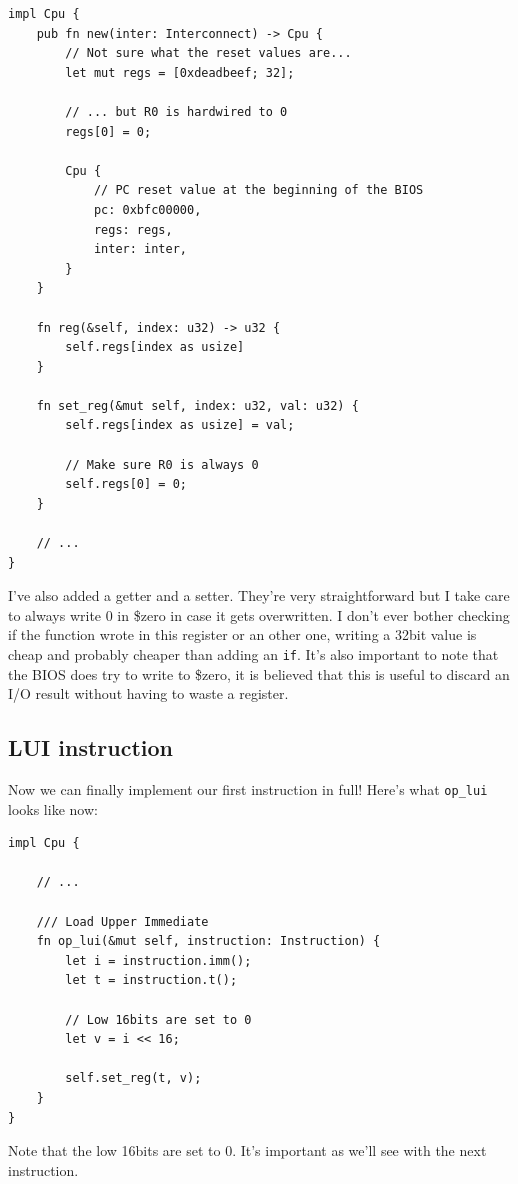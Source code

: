\documentclass[a4paper]{article}
\newcommand{\code}[1] {\texttt{#1}}
\begin{document}
\begin{lstlisting}
impl Cpu {
    pub fn new(inter: Interconnect) -> Cpu {
        // Not sure what the reset values are...
        let mut regs = [0xdeadbeef; 32];

        // ... but R0 is hardwired to 0
        regs[0] = 0;

        Cpu {
            // PC reset value at the beginning of the BIOS
            pc: 0xbfc00000,
            regs: regs,
            inter: inter,
        }
    }

    fn reg(&self, index: u32) -> u32 {
        self.regs[index as usize]
    }

    fn set_reg(&mut self, index: u32, val: u32) {
        self.regs[index as usize] = val;

        // Make sure R0 is always 0
        self.regs[0] = 0;
    }

    // ...
}
\end{lstlisting}

I've also added a getter and a setter. They're very straightforward
but I take care to always write 0 in \$zero in case it gets
overwritten. I don't ever bother checking if the function wrote in
this register or an other one, writing a 32bit value is cheap and
probably cheaper than adding an \code{if}. It's also important to
note that the BIOS does try to write to \$zero, it is believed that
this is useful to discard an I/O result without having to waste a
register.

\subsection{LUI instruction}

Now we can finally implement our first instruction in full! Here's
what \code{op\_lui} looks like now:

\begin{lstlisting}
impl Cpu {

    // ...

    /// Load Upper Immediate
    fn op_lui(&mut self, instruction: Instruction) {
        let i = instruction.imm();
        let t = instruction.t();

        // Low 16bits are set to 0
        let v = i << 16;

        self.set_reg(t, v);
    }
}
\end{lstlisting}

Note that the low 16bits are set to 0. It's important as we'll see
with the next instruction.
\end{document}
